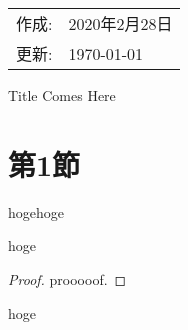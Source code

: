\documentclass[dvipdfmx,uplatex]{jsarticle}
\begin{document}
\begin{flushright}
  \begin{tabular}{rl}
    作成: & 2020年2月28日\\
    更新: & \today
  \end{tabular}
\end{flushright}
%
\begin{center}
  {\LARGE Title Comes Here}
\end{center}
\section{第1節}
%
\begin{tcolorbox}[enhanced,
    colframe=black, 
    colback=white,%
    boxrule=.75pt, 
    drop fuzzy shadow=black!30!white,
    fonttitle = \bfseries]
\begin{lemma}
hogehoge
\end{lemma}
\end{tcolorbox}
%
\vspace{\baselineskip}
\begin{defbox}
\begin{definition}
  hoge
\end{definition}
\end{defbox}
%
\begin{proof}
prooooof.  
\end{proof}
%
\vspace{\baselineskip}
\begin{theorembox}
\begin{theorem}
  hoge
\end{theorem}
\end{theorembox}
%
\end{document}

